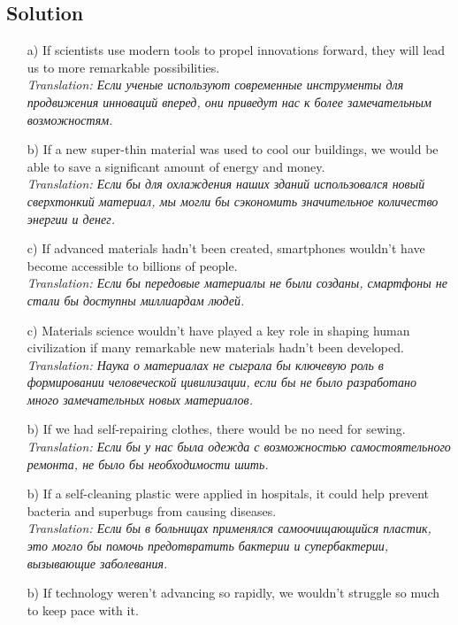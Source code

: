 \subsection*{Solution}
\begin{enumerate}
      \item[a)] If scientists use modern tools to propel innovations forward, they will lead us to more remarkable possibilities.\\
            \textit{Translation: Если ученые используют современные инструменты для продвижения инноваций вперед, они приведут нас к более замечательным возможностям.}
      \item[b)] If a new super-thin material was used to cool our buildings, we would be able to save a significant amount of energy and money.\\
            \textit{Translation: Если бы для охлаждения наших зданий использовался новый сверхтонкий материал, мы могли бы сэкономить значительное количество энергии и денег.}
      \item[c)] If advanced materials hadn’t been created, smartphones wouldn’t have become accessible to billions of people.\\
            \textit{Translation: Если бы передовые материалы не были созданы, смартфоны не стали бы доступны миллиардам людей.}
      \item[c)] Materials science wouldn’t have played a key role in shaping human civilization if many remarkable new materials hadn’t been developed.\\
            \textit{Translation: Наука о материалах не сыграла бы ключевую роль в формировании человеческой цивилизации, если бы не было разработано много замечательных новых материалов.}
      \item[b)] If we had self-repairing clothes, there would be no need for sewing.\\
            \textit{Translation: Если бы у нас была одежда с возможностью самостоятельного ремонта, не было бы необходимости шить.}
      \item[b)] If a self-cleaning plastic were applied in hospitals, it could help prevent bacteria and superbugs from causing diseases.\\
            \textit{Translation: Если бы в больницах применялся самоочищающийся пластик, это могло бы помочь предотвратить бактерии и супербактерии, вызывающие заболевания.}
      \item[b)] If technology weren’t advancing so rapidly, we wouldn’t struggle so much to keep pace with it.\\

\end{enumerate}
